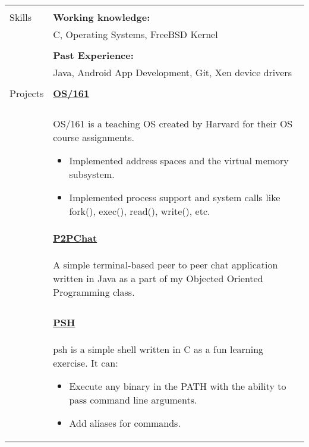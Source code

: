 \documentclass[letterpaper,11pt,oneside]{article}
\begin{document}
\begin{tabularx}{\textwidth}{l X}
    & \\
 \Large{Skills} & \textbf{Working knowledge:} \\
    & C, Operating Systems, FreeBSD Kernel \\
    & \\
    & \textbf{Past Experience:} \\
    & Java, Android App Development, Git, Xen device drivers \\
    & \\
 \Large{Projects} \vspace{-1.5ex} & \textbf{\href{https://github.com/prati0100/OS161}{OS/161}} \\
    \\
    & OS/161 is a teaching OS created by Harvard for their OS course assignments. \vspace{-0.75ex}
    \begin{itemize}[label={--}]
    \setlength\itemsep{-0.25em}
        \item Implemented address spaces and the virtual memory subsystem.
        \item Implemented process support and system calls like fork(), exec(), read(), write(), etc.
    \end{itemize} \\
    \vspace{-2.5ex} &  \textbf{\href{https://github.com/prati0100/P2PChat}{P2PChat}} \\
    \vspace{-3ex} & \begin{adjustwidth}{}{}A simple terminal-based peer to peer chat application written in Java as a part of my Objected Oriented Programming class.\end{adjustwidth} \\
    & \\
    & \vspace{-3ex} \textbf{\href{https://github.com/prati0100/psh}{PSH}} \\
    & \vspace{-1.5ex} psh is a simple shell written in C as a fun learning exercise. It can:
    \begin{itemize}[label={--}]
    \setlength\itemsep{-0.25em}
        \item Execute any binary in the PATH with the ability to pass command line arguments.
        \item Add aliases for commands.

\end{itemize}
\end{tabularx}
\end{document}

